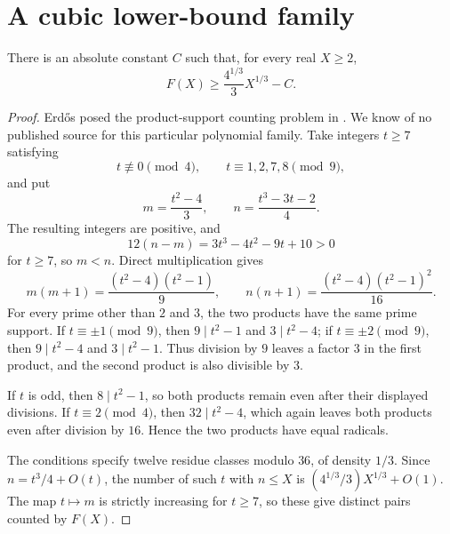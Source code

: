 \section{A cubic lower-bound family}\label{sec:cubic-family}

\begin{theorem}\label{thm:cubic-family}
There is an absolute constant $C$ such that, for every real $X\ge2$,
\[
F(X)\ge \frac{4^{1/3}}{3}X^{1/3}-C.
\]
\end{theorem}

\begin{proof}
Erd\H{o}s posed the product-support counting problem in
\cite{Erdos1980}. We know of no published source for this particular
polynomial family.
Take integers $t\ge7$ satisfying
\[
t\not\equiv0\pmod4,\qquad t\equiv1,2,7,8\pmod9,
\]
and put
\[
m=\frac{t^2-4}{3},\qquad n=\frac{t^3-3t-2}{4}.
\]
The resulting integers are positive, and
\[
12(n-m)=3t^3-4t^2-9t+10>0
\]
for $t\ge7$, so $m<n$. Direct multiplication gives
\[
m(m+1)=\frac{(t^2-4)(t^2-1)}9,\qquad
n(n+1)=\frac{(t^2-4)(t^2-1)^2}{16}.
\]
For every prime other than $2$ and $3$, the two products have the same
prime support. If $t\equiv\pm1\pmod9$, then $9\mid t^2-1$ and
$3\mid t^2-4$; if $t\equiv\pm2\pmod9$, then $9\mid t^2-4$ and
$3\mid t^2-1$. Thus division by $9$ leaves a factor $3$ in the first
product, and the second product is also divisible by $3$.

If $t$ is odd, then $8\mid t^2-1$, so both products remain even after
their displayed divisions. If $t\equiv2\pmod4$, then
$32\mid t^2-4$, which again leaves both products even after division by
$16$. Hence the two products have equal radicals.

The conditions specify twelve residue classes modulo $36$, of density
$1/3$. Since $n=t^3/4+O(t)$, the number of such $t$ with $n\le X$ is
$(4^{1/3}/3)X^{1/3}+O(1)$. The map $t\mapsto m$ is strictly increasing
for $t\ge7$, so these give distinct pairs counted by $F(X)$.
\end{proof}
